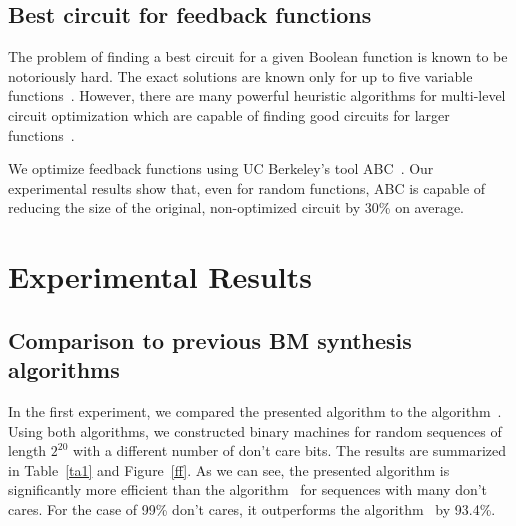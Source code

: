 \documentclass[10pt,conference]{IEEEtran}
\begin{document}
\subsection{Best circuit for feedback functions}

The problem of finding a best circuit for a given Boolean function is known 
to be notoriously hard.
The exact solutions are known only for up to five variable functions~\cite{Kn98}.
However, there are many powerful heuristic algorithms for multi-level circuit optimization which are capable of finding good circuits for larger functions~\cite{espr}. 

We optimize feedback functions using UC Berkeley's tool ABC~\cite{abc}.
Our experimental results show that, even for random functions, ABC is 
capable of reducing the size of the original, non-optimized circuit by 30\% on average.

\section{Experimental Results} \label{exp}

\subsection{Comparison to previous BM synthesis algorithms}

In the first experiment, we compared the presented algorithm to the
algorithm~\cite{Du11a}. Using both algorithms, we constructed binary machines
for random sequences of length $2^{20}$ with a different number of don't care bits.
The results are summarized in Table~\ref{ta1} and Figure~\ref{ff}. 
As we can see, the presented
algorithm is significantly more efficient than the algorithm~\cite{Du11a}
for sequences with many don't cares. For the case of 99\% don't cares, it
outperforms the algorithm~\cite{Du11a} by 93.4\%.  
\end{document}
